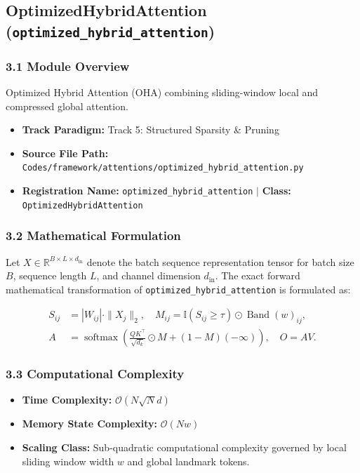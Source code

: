 \subsection{OptimizedHybridAttention (\texttt{optimized\_hybrid\_attention})}
\label{sec:app_module_optimized_hybrid_attention}

\subsubsection*{3.1 Module Overview}
Optimized Hybrid Attention (OHA) combining sliding-window local and compressed global attention.
\begin{itemize}
    \item \textbf{Track Paradigm:} Track 5: Structured Sparsity \& Pruning
    \item \textbf{Source File Path:} \texttt{Codes/framework/attentions/optimized\_hybrid\_attention.py}
    \item \textbf{Registration Name:} \texttt{optimized\_hybrid\_attention} $\mid$ \textbf{Class:} \texttt{OptimizedHybridAttention}
\end{itemize}

\subsubsection*{3.2 Mathematical Formulation}
Let $X \in \mathbb{R}^{B \times L \times d_{\text{in}}}$ denote the batch sequence representation tensor for batch size $B$, sequence length $L$, and channel dimension $d_{\text{in}}$. The exact forward mathematical transformation of \texttt{optimized\_hybrid\_attention} is formulated as:

\begin{align}
S_{ij} &= |W_{ij}| \cdot \|X_j\|_2, \quad M_{ij} = \mathbb{I}(S_{ij} \ge \tau) \odot \operatorname{Band}(w)_{ij}, \\
A &= \operatorname{softmax}\left(\frac{Q K^\top}{\sqrt{d_k}} \odot M + (1 - M)(-\infty)\right), \quad O = A V.
\end{align}


\subsubsection*{3.3 Computational Complexity}
\begin{itemize}
    \item \textbf{Time Complexity:} $\mathcal{O}(N \sqrt{N} d)$
    \item \textbf{Memory State Complexity:} $\mathcal{O}(N w)$
    \item \textbf{Scaling Class:} Sub-quadratic computational complexity governed by local sliding window width $w$ and global landmark tokens.
\end{itemize}

